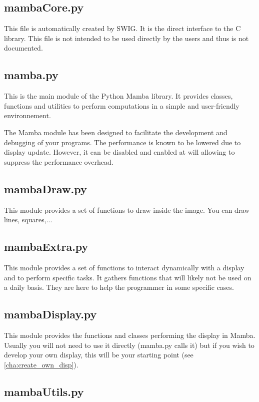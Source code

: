 \documentclass[a4paper,10pt,oneside]{article}
\begin{document}
\subsection{mambaCore.py}

This file is automatically created by SWIG. It is the direct interface to the C 
library. This file is not intended to be used directly by the users and thus is
not documented.

\subsection{mamba.py}

This is the main module of the Python Mamba library.
It provides classes, functions and utilities to perform computations in a simple
and user-friendly environnement.

The Mamba module has been designed to facilitate the development and debugging 
of your programs. The performance is known to be lowered due to display update.
However, it can be disabled and enabled at will allowing to suppress the 
performance overhead.

\subsection{mambaDraw.py}

This module provides a set of functions to draw inside the image. You can draw
lines, squares,...

\subsection{mambaExtra.py}

This module provides a set of functions to interact dynamically with a display
and to perform specific tasks. It gathers functions that will likely not be used on a
daily basis. They are here to help the programmer in some specific cases.

\subsection{mambaDisplay.py}

This module provides the functions and classes performing the display in Mamba.
Usually you will not need to use it directly (mamba.py calls it) but if you wish
to develop your own display, this will be your starting point (see 
\ref{cha:create_own_disp}).

\subsection{mambaUtils.py}
\end{document}
